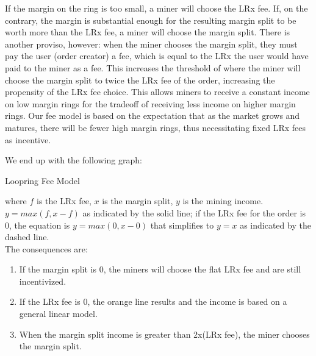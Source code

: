 \documentclass[UTF8,nofonts]{article}
\makeatletter
\newenvironment{figurehere}
 {\def\@captype{figure}}
 {}
\makeatother
\begin{document}
\begin{multicols}{2}
If the margin on the ring is too small, a miner will choose the LRx fee. If, on the contrary, the margin is substantial enough for the resulting margin split to be worth more than the LRx fee, a miner will choose the margin split. There is another proviso, however: when the miner chooses the margin split, they must pay the user (order creator) a fee, which is equal to the LRx the user would have paid to the miner as a fee. This increases the threshold of where the miner will choose the margin split to twice the LRx fee of the order, increasing the propensity of the LRx fee choice. This allows miners to receive a constant income on low margin rings for the tradeoff of receiving less income on higher margin rings. Our fee model is based on the expectation that as the market grows and matures, there will be fewer high margin rings, thus necessitating fixed LRx fees as incentive.


We end up with the following graph:

\begin{center}
\begin{figurehere}
\centering
{}
\caption{Loopring Fee Model}
\label{fig:feemodel}
\end{figurehere}
\end{center}

where $f$ is the LRx fee, $x$ is the margin split, $y$ is the mining income. $y=max(f, x-f)$ as indicated by the solid line; if the LRx fee for the order is $0$, the equation is $y=max(0, x - 0)$ that simplifies to $y=x$ as indicated by the dashed line.\\

The consequences are:  
\begin{enumerate}
	\item If the margin split is 0, the miners will choose the flat LRx fee and are still incentivized. 
	\item If the LRx fee is 0, the orange line results and the income is based on a general linear model.
	\item When the margin split income is greater than 2x(LRx fee), the miner chooses the margin split.
\end{enumerate}


\end{multicols}
\end{document}
